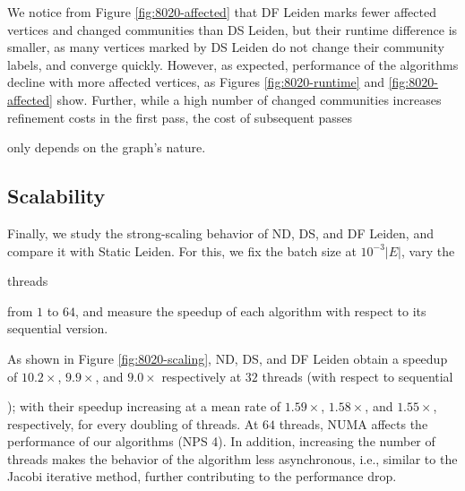


We notice from Figure \ref{fig:8020-affected} that DF Leiden marks fewer affected vertices and changed communities than DS Leiden, but their runtime difference is smaller, as many vertices marked by DS Leiden do not change their community labels, and converge quickly. However, as expected, performance of the algorithms decline with more affected vertices, as Figures \ref{fig:8020-runtime} and \ref{fig:8020-affected} show. Further, while a high number of changed communities increases refinement costs in the first pass, the cost of subsequent passes only depends on the graph's nature.




\subsection{Scalability}

Finally, we study the strong-scaling behavior of ND, DS, and DF Leiden, and compare it with Static Leiden. For this, we fix the batch size at $10^{-3} |E|$, vary the threads from $1$ to $64$, and measure the speedup of each algorithm with respect to its sequential version.

As shown in Figure \ref{fig:8020-scaling}, ND, DS, and DF Leiden obtain a speedup of $10.2\times$, $9.9\times$, and $9.0\times$ respectively at $32$ threads (with respect to sequential); with their speedup increasing at a mean rate of $1.59\times$, $1.58\times$, and $1.55\times$, respectively, for every doubling of threads. At $64$ threads, NUMA affects the performance of our algorithms (NPS 4). In addition, increasing the number of threads makes the behavior of the algorithm less asynchronous, i.e., similar to the Jacobi iterative method, further contributing to the performance drop.




